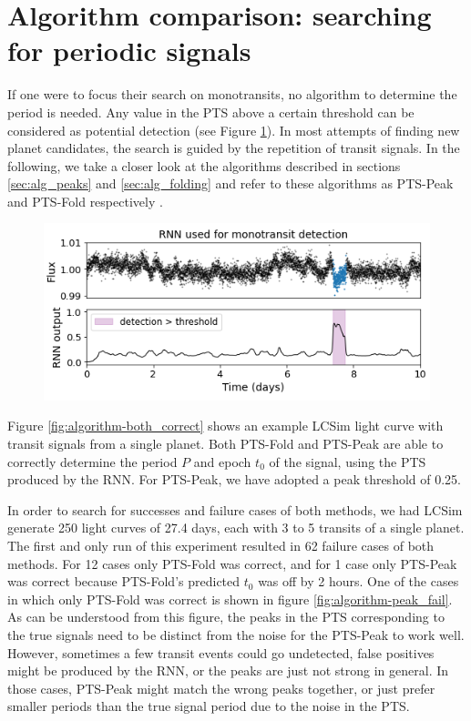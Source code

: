 
\section{Algorithm comparison: searching for periodic signals}

If one were to focus their search on monotransits, no algorithm to determine the period is needed. Any value in the PTS above a certain threshold can be considered as potential detection (see Figure \ref{fig:algorithm-mono_example}). In most attempts of finding new planet candidates, the search is guided by the repetition of transit signals. In the following, we take a closer look at the algorithms described in sections \ref{sec:alg_peaks} and \ref{sec:alg_folding} and refer to these algorithms as PTS-Peak and PTS-Fold respectively .

\begin{figure}
    \centering
    \includegraphics[width=0.6\linewidth]{Experiments/Figures/Algorithm/mono_example.png}
    \caption{}
    \label{fig:algorithm-mono_example}
\end{figure}

Figure \ref{fig:algorithm-both_correct} shows an example LCSim light curve with transit signals from a single planet. Both PTS-Fold and PTS-Peak are able to correctly determine the period $P$ and epoch $t_0$ of the signal, using the PTS produced by the RNN. For PTS-Peak, we have adopted a peak threshold of 0.25. 

In order to search for successes and failure cases of both methods, we had LCSim generate 250 light curves of 27.4 days, each with 3 to 5 transits of a single planet. The first and only run of this experiment resulted in 62 failure cases of both methods. For 12 cases only PTS-Fold was correct, and for 1 case only PTS-Peak was correct because PTS-Fold's predicted $t_0$ was off by 2 hours. One of the cases in which only PTS-Fold was correct is shown in figure \ref{fig:algorithm-peak_fail}. As can be understood from this figure, the peaks in the PTS corresponding to the true signals need to be distinct from the noise for the PTS-Peak to work well. However, sometimes a few transit events could go undetected, false positives might be produced by the RNN, or the peaks are just not strong in general. In those cases, PTS-Peak might match the wrong peaks together, or just prefer smaller periods than the true signal period due to the noise in the PTS.

